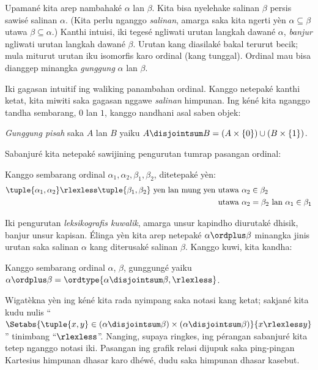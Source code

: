 \documentclass[../../../include/open-logic-section]{subfiles}
\begin{document}

Upamané kita arep nambahaké $\alpha$ lan $\beta$. Kita bisa nyelehake
{salinan} $\beta$ persis sawisé salinan $\alpha$. (Kita perlu nganggo
\emph{salinan}, amarga saka
 kita ngerti yèn $\alpha
\subseteq \beta$ utawa $\beta \subseteq \alpha$.) Kanthi intuisi, iki
tegesé ngliwati urutan langkah dawané $\alpha$, \emph{banjur}
ngliwati urutan langkah dawané $\beta$. Urutan kang diasilaké
bakal terurut becik; mula miturut
 urutan iku
isomorfis karo ordinal (kang tunggal). Ordinal mau bisa dianggep
minangka \emph{gunggung} $\alpha$ lan $\beta$.

Iki gagasan intuitif ing waliking panambahan ordinal. Kanggo
netepaké kanthi ketat, kita miwiti saka gagasan nggawe
\emph{salinan} himpunan. Ing kéné kita nganggo tandha sembarang,
$0$ lan $1$, kanggo nandhani asal saben objek:

\begin{defn}
\emph{Gunggung pisah} saka $A$ lan $B$ yaiku $A \disjointsum B = (A\times
\{0\}) \cup (B \times \{1\})$.
\end{defn}

Sabanjuré kita netepaké sawijining pengurutan tumrap pasangan ordinal:

\begin{defn}
Kanggo sembarang ordinal $\alpha_1, \alpha_2, \beta_1, \beta_2$, ditetepaké yèn:
\begin{align*}
	\tuple{\alpha_1, \alpha_2} \rlexless \tuple{\beta_1, \beta_2}\text{ yen lan mung yen }&
	\text{utawa $\alpha_2 \in \beta_2$}\\
	& \text{utawa $\alpha_2 = \beta_2$ lan $\alpha_1 \in \beta_1$}
\end{align*}
\end{defn}

Iki pengurutan \emph{leksikografis kuwalik}, amarga unsur kapindho
diurutaké dhisik, banjur unsur kapisan. Élinga yèn kita arep
netepaké $\alpha \ordplus \beta$ minangka jinis urutan saka salinan
$\alpha$ kang diterusaké salinan $\beta$. Kanggo kuwi, kita kandha:

\begin{defn}
Kanggo sembarang ordinal $\alpha$, $\beta$, gunggungé yaiku $\alpha \ordplus
\beta = \ordtype{\alpha \disjointsum \beta, \rlexless}$.
\end{defn}
\noindent
Wigatèkna yèn ing kéné kita rada nyimpang saka notasi kang ketat;
sakjané kita kudu nulis “$\Setabs{\tuple{x,y}\in (\alpha\disjointsum\beta)\times(\alpha\disjointsum\beta)}{x \rlexless y}$” tinimbang “$\rlexless$”. Nanging, supaya ringkes,
ing pérangan sabanjuré kita tetep nganggo notasi iki.
Pasangan ing grafik relasi dijupuk saka ping-pingan Kartesius himpunan dhasar karo dhéwé, dudu saka himpunan dhasar kasebut.
\end{document}
